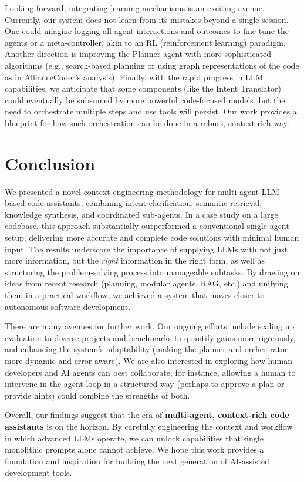 \documentclass[11pt]{article}
\begin{document}
Looking forward, integrating learning mechanisms is an exciting avenue. Currently, our system does not learn from its mistakes beyond a single session. One could imagine logging all agent interactions and outcomes to fine-tune the agents or a meta-controller, akin to an RL (reinforcement learning) paradigm. Another direction is improving the Planner agent with more sophisticated algorithms (e.g., search-based planning or using graph representations of the code as in AllianceCoder's analysis). Finally, with the rapid progress in LLM capabilities, we anticipate that some components (like the Intent Translator) could eventually be subsumed by more powerful code-focused models, but the need to orchestrate multiple steps and use tools will persist. Our work provides a blueprint for how such orchestration can be done in a robust, context-rich way.

\section{Conclusion}
We presented a novel context engineering methodology for multi-agent LLM-based code assistants, combining intent clarification, semantic retrieval, knowledge synthesis, and coordinated sub-agents. In a case study on a large codebase, this approach substantially outperformed a conventional single-agent setup, delivering more accurate and complete code solutions with minimal human input. The results underscore the importance of supplying LLMs with not just more information, but the \emph{right} information in the right form, as well as structuring the problem-solving process into manageable subtasks. By drawing on ideas from recent research (planning, modular agents, RAG, etc.) and unifying them in a practical workflow, we achieved a system that moves closer to autonomous software development.

There are many avenues for further work. Our ongoing efforts include scaling up evaluation to diverse projects and benchmarks to quantify gains more rigorously, and enhancing the system's adaptability (making the planner and orchestrator more dynamic and error-aware). We are also interested in exploring how human developers and AI agents can best collaborate; for instance, allowing a human to intervene in the agent loop in a structured way (perhaps to approve a plan or provide hints) could combine the strengths of both.

Overall, our findings suggest that the era of \textbf{multi-agent, context-rich code assistants} is on the horizon. By carefully engineering the context and workflow in which advanced LLMs operate, we can unlock capabilities that single monolithic prompts alone cannot achieve. We hope this work provides a foundation and inspiration for building the next generation of AI-assisted development tools.
\end{document}
